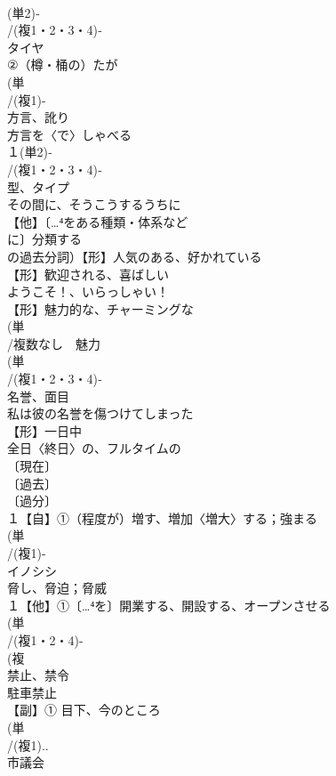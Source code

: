 \documentclass[8pt]{extreport}
\begin{document}
\begin{CJK}{UTF8}{min}
\\	(単2)‐
\\	/(複1・2・3・4)‐ 
\\	タイヤ 
\\	②（樽・桶の）たが
\\	(単
\\	/(複1)-
\\	方言、訛り 
\\	方言を〈で〉しゃべる
\\	１(単2)‐
\\	/(複1・2・3・4)‐
\\	型、タイプ 
\\	その間に、そうこうするうちに
\\	【他】〔…⁴をある種類・体系など
\\	に〕分類する 
\\	の過去分詞）【形】人気のある、好かれている 
\\	【形】歓迎される、喜ばしい 
\\	[ほんとうに]ようこそ！、いらっしゃい！ 
\\	【形】魅力的な、チャーミングな 
\\	(単
\\	/複数なし　魅力 
\\	(単
\\	/(複1・2・3・4)‐
\\	名誉、面目 
\\	私は彼の名誉を傷つけてしまった
\\	【形】一日中　
\\	全日〈終日〉の、フルタイムの 
\\	〔現在〕
\\	〔過去〕
\\	〔過分〕
\\	１【自】①（程度が）増す、増加〈増大〉する；強まる 
\\	(単
\\	/(複1)-
\\	イノシシ 
\\	脅し、脅迫；脅威 
\\	１【他】①〔…⁴を〕開業する、開設する、オープンさせる 
\\	(単
\\	/(複1・2・4)-
\\	(複
\\	禁止、禁令 
\\	駐車禁止
\\	【副】① 目下、今のところ
\\	(単
\\	/(複1)..
\\	市議会 

\end{CJK}
\end{document}
